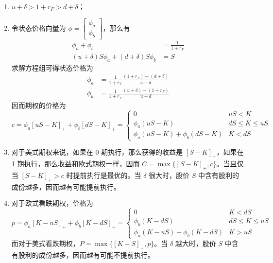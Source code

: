 \begin{solution}
\begin{enumerate}[label=(\alph*)]
    \item $u+\delta>1+r_{F}>d+\delta$；
    \item 令状态价格向量为 $\phi=\begin{bmatrix}\phi_{a} \\ \phi_{b}\end{bmatrix}$，那么有
    \[
        \begin{aligned}
            \phi_{a}+\phi_{b}&=\frac{1}{1+r_{F}}\\
            (u+\delta)S\phi_{a}+(d+\delta)S\phi_{b}&=S
        \end{aligned}
    \]
    求解方程组可得状态价格为
    \[
        \begin{aligned}
            \phi_{a}&=\frac{1}{1+r_{F}}\frac{(1+r_{F})-(d+\delta)}{u-d}\\
            \phi_{b}&=\frac{1}{1+r_{F}}\frac{(u+\delta)-(1+r_{F})}{u-d}
        \end{aligned}
    \]
    因而期权的价格为
    \[
        c=\phi_{a}[uS-K]_{+}+\phi_{b}[dS-K]_{+}=
        \begin{cases}
            0 & uS<K\\
            \phi_{a}(uS-K) & dS\le K\le uS\\
            \phi_{a}(uS-K)+\phi_{b}(dS-K) & K<dS
        \end{cases}
    \]
    \item 对于美式期权来说，如果在 0 期执行，那么获得的收益是 $[S-K]_{+}$，如果在 1 期执行，那么收益和欧式期权一样，因而 $C=\max\{[S-K]_{+},c\}$。当且仅当 $[S-K]_{+}>c$ 时提前执行是最优的。当 $\delta$ 很大时，股价 $S$ 中含有股利的成份越多，因而越有可能提前执行。
    \item 对于欧式看跌期权，价格为
    \[
        p=\phi_{a}[K-uS]_{+}+\phi_{b}[K-dS]_{+}=
        \begin{cases}
            0 & K<dS\\
            \phi_{b}(K-dS) & dS\le K\le uS\\
            \phi_{a}(K-uS)+\phi_{b}(K-dS) & K>uS
        \end{cases}
    \]
    而对于美式看跌期权，$P=\max\{[K-S]_{+},p\}$。当 $\delta$ 越大时，股价 $S$ 中含有股利的成份越多，因而越有可能不提前执行。
\end{enumerate}
\end{solution}


